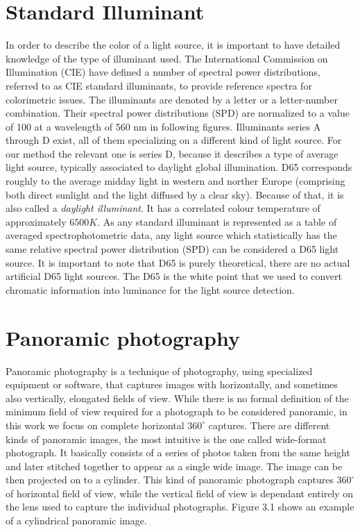 \section{Standard Illuminant}
In order to describe the color of a light source, it is important to have detailed knowledge of the type of illuminant used. The International Commission on Illumination (CIE)  have defined a number of spectral power distributions, referred to as CIE standard illuminants, to provide reference spectra for colorimetric issues. The illuminants are denoted by a letter or a letter-number combination. Their spectral power distributions (SPD) are normalized to a value of 100 at a wavelength of 560 nm in following figures. Illuminants series A through D exist, all of them specializing on a different kind of light source. For our method the relevant one is series D, because it describes a type of average light source, typically associated to daylight global illumination.\newline
D65 corresponds roughly to the average midday light in western and norther Europe (comprising both direct sunlight and the light diffused by a clear sky). Because of that, it is also called a \emph{daylight illuminant}. It has a correlated colour temperature of approximately $6500 K$. As any standard illuminant is represented as a table of averaged spectrophotometric data, any light source which statistically has the same relative spectral power distribution (SPD) can be considered a D65 light source. It is important to note that D65 is purely theoretical, there are no actual artificial D65 light sources. The D65 is the white point that we used to convert chromatic information into luminance for the light source detection.

\section{Panoramic photography}
Panoramic photography is a technique of photography, using specialized equipment or software, that captures images with horizontally, and sometimes also vertically, elongated fields of view. While there is no formal definition of the minimum field of view required for a photograph to be considered panoramic, in this work we focus on complete horizontal $360^{\circ}$ captures.\newline
There are different kinds of panoramic images, the most intuitive is the one called wide-format photograph. It basically consists of a series of photos taken from the same height and later stitched together to appear as a single wide image. The image can be then projected on to a cylinder. This kind of panoramic photograph captures $360^{\circ}$ of horizontal field of view, while the vertical field of view is dependant entirely on the lens used to capture the individual photographs. Figure 3.1 shows an example of a cylindrical panoramic image. 

